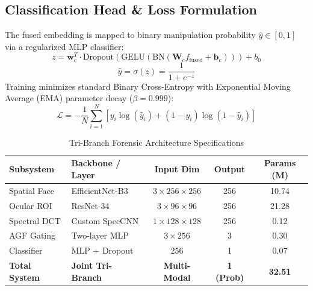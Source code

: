 \documentclass[journal,10pt,twocolumn]{IEEEtran}
\begin{document}
\subsection{Classification Head \& Loss Formulation}
The fused embedding is mapped to binary manipulation probability $\hat{y} \in [0, 1]$ via a regularized MLP classifier:
\begin{equation}
    z = \mathbf{w}_c^T \cdot \text{Dropout}(\text{GELU}(\text{BN}(\mathbf{W}_c f_{\text{fused}} + \mathbf{b}_c))) + b_0
\end{equation}
\begin{equation}
    \hat{y} = \sigma(z) = \frac{1}{1 + e^{-z}}
\end{equation}
Training minimizes standard Binary Cross-Entropy with Exponential Moving Average (EMA) parameter decay ($\beta = 0.999$):
\begin{equation}
    \mathcal{L} = -\frac{1}{N} \sum_{i=1}^N \left[ y_i \log(\hat{y}_i) + (1 - y_i) \log(1 - \hat{y}_i) \right]
\end{equation}

\begin{table}[t]
\centering
\caption{Tri-Branch Forensic Architecture Specifications}
\label{tab:architecture}
\begin{tabular}{llccc}
\toprule
\textbf{Subsystem} & \textbf{Backbone / Layer} & \textbf{Input Dim} & \textbf{Output} & \textbf{Params (M)} \\
\midrule
Spatial Face & EfficientNet-B3 & $3 \times 256 \times 256$ & 256 & 10.74 \\
Ocular ROI   & ResNet-34       & $3 \times 96 \times 96$   & 256 & 21.28 \\
Spectral DCT & Custom SpecCNN  & $1 \times 128 \times 128$ & 256 & 0.12 \\
AGF Gating   & Two-layer MLP   & $3 \times 256$            & 3   & 0.30 \\
Classifier   & MLP + Dropout   & 256                       & 1   & 0.07 \\
\midrule
\textbf{Total System} & \textbf{Joint Tri-Branch} & \textbf{Multi-Modal} & \textbf{1 (Prob)} & \textbf{32.51} \\
\bottomrule
\end{tabular}
\end{table}
\end{document}
